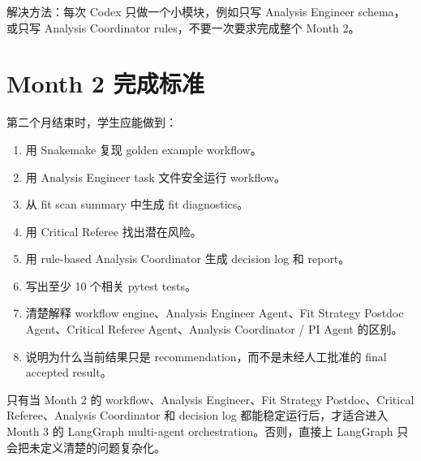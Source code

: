 \documentclass[11pt,a4paper,fontset=none]{ctexart}
\begin{document}
解决方法：每次 Codex 只做一个小模块，例如只写 Analysis Engineer schema，或只写 Analysis Coordinator rules，不要一次要求完成整个 Month 2。

\section{Month 2 完成标准}

第二个月结束时，学生应能做到：

\begin{enumerate}[leftmargin=2em]
  \item 用 Snakemake 复现 golden example workflow。
  \item 用 Analysis Engineer task 文件安全运行 workflow。
  \item 从 fit scan summary 中生成 fit diagnostics。
  \item 用 Critical Referee 找出潜在风险。
  \item 用 rule-based Analysis Coordinator 生成 decision log 和 report。
  \item 写出至少 10 个相关 pytest tests。
  \item 清楚解释 workflow engine、Analysis Engineer Agent、Fit Strategy Postdoc Agent、Critical Referee Agent、Analysis Coordinator / PI Agent 的区别。
  \item 说明为什么当前结果只是 recommendation，而不是未经人工批准的 final accepted result。
\end{enumerate}

\begin{tcolorbox}[colback=green!4,colframe=green!40!black,title=进入 Month 3 的条件]
只有当 Month 2 的 workflow、Analysis Engineer、Fit Strategy Postdoc、Critical Referee、Analysis Coordinator 和 decision log 都能稳定运行后，才适合进入 Month 3 的 LangGraph multi-agent orchestration。否则，直接上 LangGraph 只会把未定义清楚的问题复杂化。
\end{tcolorbox}
\end{document}
